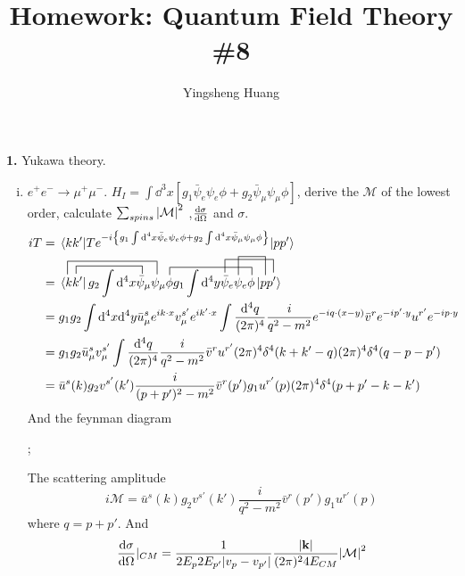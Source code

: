 \documentclass{article}
\title{Homework: Quantum Field Theory \#8}
\author{Yingsheng Huang}
\newcommand{\s}{\sigma}
\begin{document}
\maketitle
{\bf1.}\quad
Yukawa theory.

\begin{enumerate}[(i)]
  \item $e^+e^-\rightarrow\mu^+\mu^-$. $H_I=\int\dd^3x[g_1\bar\psi_e\psi_e\phi+g_2\bar\psi_{\mu}\psi_{\mu}\phi]$, derive the $\mathcal{M}$ of the lowest order, calculate $\sum_{spins}\abs{\mathcal{M}}^2$ ,$\dv{\s}{\Omega}$ and $\s$.
  \begin{align*}
    iT&=\mel{kk'}{Te^{-i\Bqty{g_1\int\dd^4x\bar\psi_e\psi_e\phi+g_2\int\dd^4x\bar\psi_{\mu}\psi_{\mu}\phi}}}{pp'}\\
    &=\contraction[2.5ex]{}{\bra{k}}{k' g_2\int\dd^4x\bar\psi_{\mu}}{\psi_{\mu}}\contraction[1.5ex]{k}{\bra{k'}}{g_1\int\dd^4x}{\psi_{\mu}}\contraction[1.5ex]{\bra{kk'}
    g_2\int\dd^4x\bar\psi_{\mu}\psi_{\mu}}{\phi}{g_2\int\dd^4y\bar\psi_{e}\psi_{e}}{\phi}\contraction[2.5ex]{\bra{kk'} g_1\int\dd^4x\bar\psi_{\mu}\psi_{\mu}\phi  g_2\int\dd^4y}{\bar\psi}{_{e}\psi_{e}\phi p}{\ket{p'}}\contraction[3.5ex]{\bra{kk'} g_1\int\dd^4x\bar\psi_{\mu}\psi_{\mu}\phi  g_2\int\dd^4y\bar\psi_{e}}{\psi}{_{e}\phi}{\ket{p}}\bra{kk'} g_2\int\dd^4x\bar\psi_{\mu}\psi_{\mu}\phi  g_1\int\dd^4y\bar\psi_{e}\psi_{e}\phi \ket{pp'}\\
    &=g_1g_2\int\dd^4x\dd^4y\bar u_{\mu}^se^{ik\cdot x}v^{s'}_{\mu}e^{ik'\cdot x}\int\frac{\dd^4q}{(2\pi)^4}\frac{i}{q^2-m^2}e^{-iq\cdot(x-y)}\bar v^re^{-ip'\cdot y}u^{r'}e^{-ip\cdot y}\\
    &=g_1g_2\bar u_{\mu}^sv^{s'}_{\mu}\int\frac{\dd^4q}{(2\pi)^4}\frac{i}{q^2-m^2}\bar v^ru^{r'}(2\pi)^4\delta^4(k+k'-q)(2\pi)^4\delta^4(q-p-p')\\
    &=\bar u^s(k)g_2v^{s'}(k')\frac{i}{(p+p')^2-m^2}\bar v^r(p')g_1u^{r'}(p)(2\pi)^4\delta^4(p+p'-k-k')
  \end{align*}
  And the feynman diagram
  \begin{center}
    ;
  \end{center}
  The scattering amplitude
  $$i\mathcal{M}=\bar u^s(k)g_2v^{s'}(k')\frac{i}{q^2-m^2}\bar v^r(p')g_1u^{r'}(p)$$
  where $q=p+p'$.
  And
  $$\dv{\s}{\Omega}|_{CM}=\frac{1}{2E_p2E_{p'}\abs{v_p-v_{p'}}}\frac{\abs{\vb{k}}}{(2\pi)^24E_{CM}}\abs{\mathcal{M}}^2$$

\end{enumerate}
\end{document}
